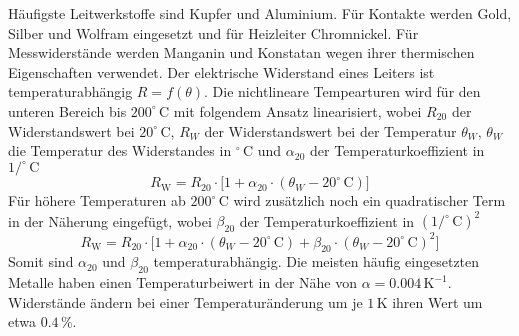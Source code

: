\noindent Häufigste Leitwerkstoffe sind Kupfer und Aluminium. Für Kontakte werden Gold, Silber und Wolfram eingesetzt und für Heizleiter Chromnickel. Für Messwiderstände werden Manganin und Konstatan wegen ihrer thermischen Eigenschaften verwendet. Der elektrische Widerstand eines Leiters ist temperaturabhängig $R=f\left(\theta\right)$.
\newline\newline
Die nichtlineare Tempearturen wird für den unteren Bereich bis $200^{\circ}\,\text{C}$ mit folgendem Ansatz linearisiert, wobei $R_{20}$ der Widerstandswert bei $20^{\circ}\,\text{C}$, $R_W$ der Widerstandswert bei der Temperatur $\theta_W$, $\theta_W$ die Temperatur des Widerstandes in $^{\circ}\,\text{C}$ und $\alpha_{20}$ der Temperaturkoeffizient in $1/^{\circ}\,\text{C}$
\begin{equation}
\boxed{R_{\text{W}}=R_{20}\cdot \Big[1+\alpha_{20}\cdot \left(\theta_W-20^{\circ}\,\text{C}\right)\Big]}
\end{equation}
Für höhere Temperaturen ab $200^{\circ}\,\text{C}$ wird zusätzlich noch ein quadratischer Term in der Näherung eingefügt, wobei $\beta_{20}$ der Temperaturkoeffizient in $\left(1/^{\circ}\,\text{C}\right)^2$
\begin{equation}
\boxed{R_{\text{W}}=R_{20}\cdot \Big[1+\alpha_{20}\cdot \left(\theta_W-20^{\circ}\,\text{C}\right)+\beta_{20}\cdot \left(\theta_W-20^{\circ}\,\text{C}\right)^2\Big]}
\end{equation}
Somit sind $\alpha_{20}$ und $\beta_{20}$ temperaturabhängig. Die meisten häufig eingesetzten Metalle haben einen Temperaturbeiwert in der Nähe von $\alpha=0.004\,\text{K}^{-1}$. Widerstände ändern bei einer Temperaturänderung um je $1\,\text{K}$ ihren Wert um etwa $0.4\,\%$.

